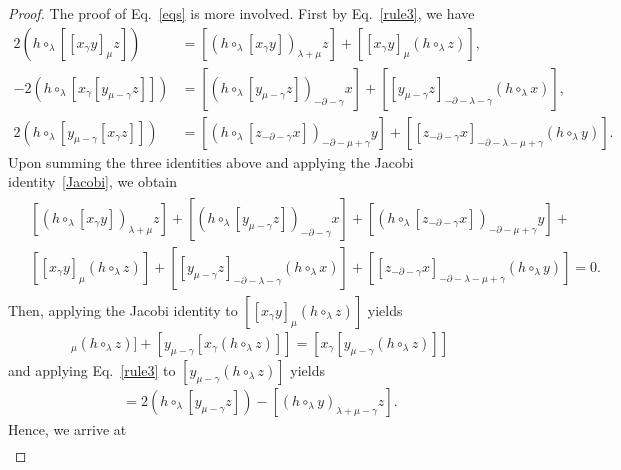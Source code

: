 \documentclass[10pt,a4paper]{amsart}
\begin{document}
\begin{proof}
The proof of Eq.~\eqref{eqs} is more involved. First by Eq.~\eqref{rule3}, we have
   \begin{align*}
      2(h\circ_{\lambda}[[x_{\gamma}y]_{\mu}z])&=[(h\circ_{\lambda}[x_{\gamma}y])_{\lambda+\mu}z]+[[x_{\gamma}y]_{\mu}(h\circ_{\lambda}z)],\\
      -2(h\circ_{\lambda}[x_{\gamma}[y_{\mu-\gamma}z]])&=[(h\circ_{\lambda}[y_{\mu-\gamma}z])_{-\partial-\gamma}x]+[[y_{\mu-\gamma}z]_{-\partial-\lambda-\gamma}(h\circ_{\lambda}x)],\\
      2(h\circ_{\lambda}[y_{\mu-\gamma}[x_{\gamma}z]])&=[(h\circ_{\lambda}[z_{-\partial-\gamma}x])_{-\partial-\mu+\gamma}y]+[[z_{-\partial-\gamma}x]_{-\partial-\lambda-\mu+\gamma}(h\circ_{\lambda}y)].
   \end{align*}
Upon summing the three identities above and applying the Jacobi identity~\eqref{Jacobi}, we obtain
   \begin{eqnarray}\label{Id1}
      \begin{aligned}
      &[(h\circ_{\lambda}[x_{\gamma}y])_{\lambda+\mu}z]+[(h\circ_{\lambda}[y_{\mu-\gamma}z])_{-\partial-\gamma}x]+[(h\circ_{\lambda}[z_{-\partial-\gamma}x])_{-\partial-\mu+\gamma}y]+ \\
      &[[x_{\gamma}y]_{\mu}(h\circ_{\lambda}z)]+[[y_{\mu-\gamma}z]_{-\partial-\lambda-\gamma}(h\circ_{\lambda}x)]+[[z_{-\partial-\gamma}x]_{-\partial-\lambda-\mu+\gamma}(h\circ_{\lambda}y)]=0.
      \end{aligned}
   \end{eqnarray}
Then, applying the Jacobi identity to $[[x_{\gamma}y]_{\mu}(h\circ_{\lambda}z)]$ yields
   \begin{align*}
      [[x_{\gamma}y]_{\mu}(h\circ_{\lambda}z)]+[y_{\mu-\gamma}[x_{\gamma}(h\circ_{\lambda}z)]]=[x_{\gamma}[y_{\mu-\gamma}(h\circ_{\lambda}z)]]
   \end{align*}
and applying Eq.~\eqref{rule3} to $[y_{\mu-\gamma}(h\circ_{\lambda}z)]$ yields
   \begin{align*}
      [y_{\mu-\gamma}(h\circ_{\lambda}z)]=2\left(h\circ_{\lambda}[y_{\mu-\gamma}z]\right)-[(h\circ_{\lambda}y)_{\lambda+\mu-\gamma}z].
   \end{align*}
Hence, we arrive at
   \begin{align*}

\end{align*}
\end{proof}
\end{document}
